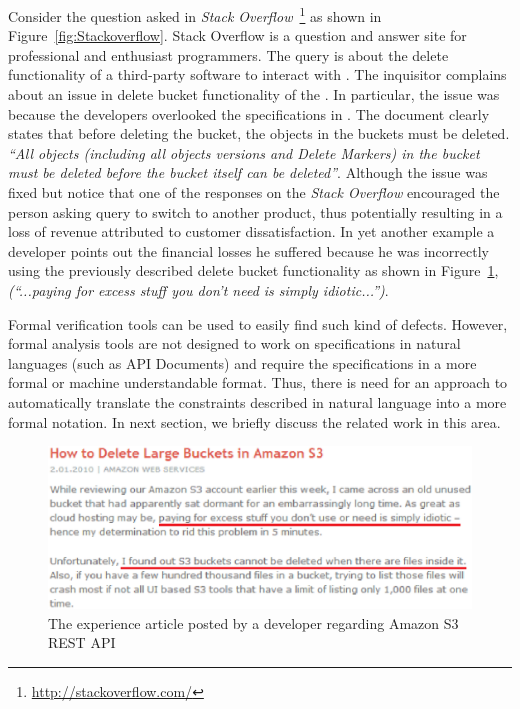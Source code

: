 Consider the question asked in \textit{Stack Overflow}~\footnote{\url{http://stackoverflow.com/}} as shown in Figure~\ref{fig:Stackoverflow}.
Stack Overflow is a question and answer site for professional and enthusiast programmers.
The query is about the delete functionality of a third-party software  to interact with \amazonAPI.
The inquisitor complains about an issue in delete bucket functionality of the .
In particular, the issue was because the  developers overlooked the specifications in \amazon.
The document clearly states that before deleting the bucket, the objects in the buckets must be deleted. \textit{``All objects (including all objects versions and Delete Markers) in the bucket must be deleted before the bucket itself can be deleted''}.
Although the issue was fixed but notice that one of the responses on the \textit{Stack Overflow} encouraged the person asking query to switch to another product, thus potentially resulting in a loss of revenue attributed to customer dissatisfaction.
In yet another example a developer points out the financial losses he suffered because he was incorrectly using the previously described delete bucket functionality as shown in Figure~\ref{fig:example2}, \textit{(``...paying for excess stuff you don't need is simply idiotic...'')}. 



Formal verification tools can be used to easily find such kind of defects.
However, formal analysis tools are not designed to work on specifications in natural languages (such as API Documents) and require the specifications in a more formal or machine understandable format. 
Thus, there is need for an approach to automatically translate the constraints described in natural language into a more formal notation. In next section, we briefly discuss the related work in this area.


\begin{figure}[t]
\begin{center}
\includegraphics[scale=0.6]{Example2.eps}
\end{center}
\caption{\label{fig:example2} The experience article posted by a developer regarding Amazon S3 REST API}
\end{figure}


 








